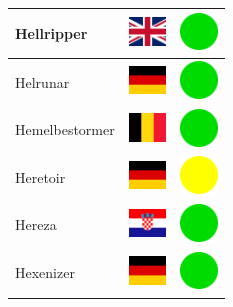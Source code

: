 \documentclass[12pt, a4paper, twoside]{report}
\begin{document}
\begin{center}
\begin{longtable}{|p{5cm}|p{2cm}|p{2cm}|}
Hellripper & \includegraphics[width=1cm]{4x3/gb} & \includegraphics[width=1cm]{likes/y} \\ \hline
Helrunar & \includegraphics[width=1cm]{4x3/de} & \includegraphics[width=1cm]{likes/y} \\ \hline
Hemelbestormer & \includegraphics[width=1cm]{4x3/be} & \includegraphics[width=1cm]{likes/y} \\ \hline
Heretoir & \includegraphics[width=1cm]{4x3/de} & \includegraphics[width=1cm]{likes/m} \\ \hline
Hereza & \includegraphics[width=1cm]{4x3/hr} & \includegraphics[width=1cm]{likes/y} \\ \hline
Hexenizer & \includegraphics[width=1cm]{4x3/de} & \includegraphics[width=1cm]{likes/y} \\ \hline

\end{longtable}
\end{center}
\end{document}
